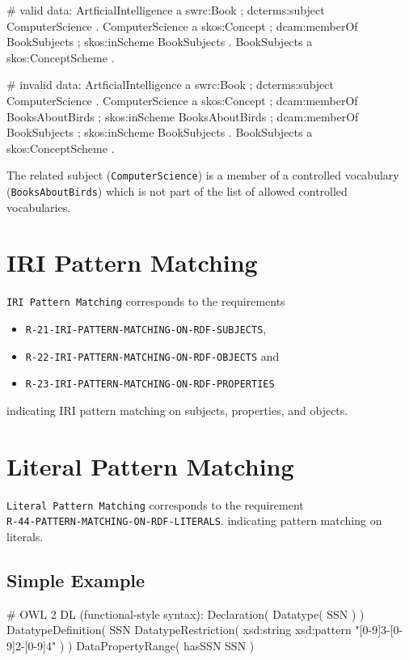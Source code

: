 \documentclass{llncs}
\newcommand{\ms}[1]{\texttt{#1}}
\begin{document}
\begin{ex}
# valid data:
ArtficialIntelligence
    a swrc:Book ;
    dcterms:subject ComputerScience .
ComputerScience
    a skos:Concept ;
    dcam:memberOf BookSubjects ;
    skos:inScheme BookSubjects .
BookSubjects
    a skos:ConceptScheme .
\end{ex}

\begin{ex}
# invalid data:
ArtficialIntelligence
    a swrc:Book ;
    dcterms:subject ComputerScience .
ComputerScience
    a skos:Concept ;
    dcam:memberOf BooksAboutBirds ;
    skos:inScheme BooksAboutBirds ;
    dcam:memberOf BookSubjects ;
    skos:inScheme BookSubjects .
BookSubjects
    a skos:ConceptScheme .
\end{ex}

The related subject (\ms{ComputerScience}) is a member of a controlled vocabulary (\ms{BooksAboutBirds}) 
which is not part of the list of allowed controlled vocabularies.

\section{IRI Pattern Matching}

\ms{IRI Pattern Matching} corresponds to the requirements
\begin{itemize}
	\item \ms{R-21-IRI-PATTERN-MATCHING-ON-RDF-SUBJECTS},
	\item \ms{R-22-IRI-PATTERN-MATCHING-ON-RDF-OBJECTS} and
	\item \ms{R-23-IRI-PATTERN-MATCHING-ON-RDF-PROPERTIES} 
\end{itemize}
indicating IRI pattern matching on subjects, properties, and objects.

\section{Literal Pattern Matching}

\ms{Literal Pattern Matching} corresponds to the requirement \\
\ms{R-44-PATTERN-MATCHING-ON-RDF-LITERALS}.
indicating pattern matching on literals.

\subsection{Simple Example}

\begin{ex}
# OWL 2 DL (functional-style syntax):
Declaration( Datatype( SSN ) ) 
DatatypeDefinition( 
    SSN
    DatatypeRestriction( xsd:string xsd:pattern "[0-9]{3}-[0-9]{2}-[0-9]{4}" ) )     
DataPropertyRange( hasSSN SSN ) 
\end{ex}
\end{document}
